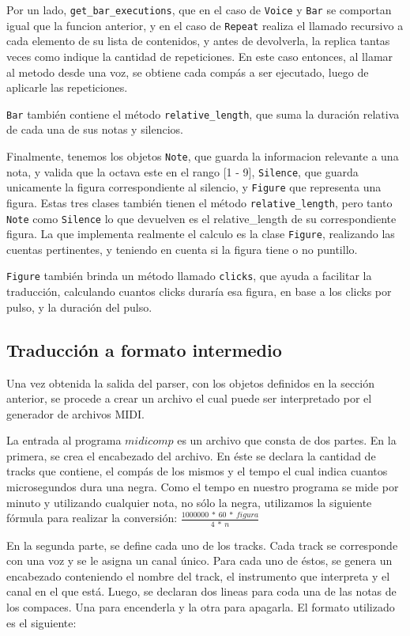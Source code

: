 \documentclass[a4paper, 10pt, twoside]{article}
\begin{document}
Por un lado, \texttt{get\_bar\_executions}, que en el caso de \texttt{Voice} y \texttt{Bar} se comportan igual que la funcion anterior, y en el caso de \texttt{Repeat} realiza el llamado recursivo a cada elemento de su lista de contenidos, y antes de devolverla, la replica tantas veces como indique la cantidad de repeticiones. En este caso entonces, al llamar al metodo desde una voz, se obtiene cada compás a ser ejecutado, luego de aplicarle las repeticiones.

\texttt{Bar} también contiene el método \texttt{relative\_length}, que suma la duración relativa de cada una de sus notas y silencios.

Finalmente, tenemos los objetos \texttt{Note}, que guarda la informacion relevante a una nota, y valida que la octava este en el rango [1 - 9], \texttt{Silence}, que guarda unicamente la figura correspondiente al silencio, y \texttt{Figure} que representa una figura. Estas tres clases también tienen el método \texttt{relative\_length}, pero tanto \texttt{Note} como \texttt{Silence} lo que devuelven es el relative\_length de su correspondiente figura. La que implementa realmente el calculo es la clase \texttt{Figure}, realizando las cuentas pertinentes, y teniendo en cuenta si la figura tiene o no puntillo.

\texttt{Figure} también brinda un método llamado \texttt{clicks}, que ayuda a facilitar la traducción, calculando cuantos clicks duraría esa figura, en base a los clicks por pulso, y la duración del pulso.

\subsection{Traducción a formato intermedio}

Una vez obtenida la salida del parser, con los objetos definidos en la sección anterior, se procede a crear un archivo el cual puede ser interpretado por el generador de archivos MIDI.

La entrada al programa $midicomp$ es un archivo que consta de dos partes. En la primera, se crea el encabezado del archivo. En éste se declara la cantidad de tracks que contiene, el compás de los mismos y el tempo el cual indica cuantos microsegundos dura una negra. Como el tempo en nuestro programa se mide por minuto y utilizando cualquier nota, no sólo la negra, utilizamos la siguiente fórmula para realizar la conversión:
$\frac{1000000\ *\ 60\ *\ figura}{4\ *\ n}$

En la segunda parte, se define cada uno de los tracks. Cada track se corresponde con una voz y se le asigna un canal único. Para cada uno de éstos, se genera un encabezado conteniendo el nombre del track, el instrumento que interpreta y el canal en el que está. Luego, se declaran dos lineas para coda una de las notas de los compaces. Una para encenderla y la otra para apagarla. El formato utilizado es el siguiente:
\end{document}
